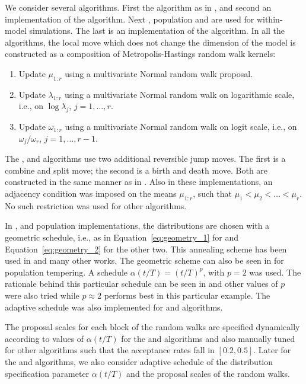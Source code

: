 We consider several algorithms. First the \rjmcmc algorithm as in
\cite{Richardson:1997ea}, and second an implementation of the \smc[1]
algorithm. Next \ais, population \mcmc and \smc[2] are used for within-model
simulations. The last is an implementation of the \smc[3] algorithm. In all
the algorithms, the local move which does not change the dimension of the
model is constructed as a composition of Metropolis-Hastings random walk
kernels:
\begin{enumerate}
  \item Update $\mu_{1:r}$ using a multivariate Normal random walk proposal.
  \item Update $\lambda_{1:r}$ using a multivariate Normal random walk on
    logarithmic scale, i.e., on $\log\lambda_{j}$, $j = 1, \dots, r$.
  \item Update $\omega_{1:r}$ using a multivariate Normal random walk on logit
    scale, i.e., on $\omega_{j}/\omega_r$, $j = 1,\dots,r-1$.
\end{enumerate}
The \rjmcmc, \smc[1] and \smc[3] algorithms use two additional
reversible jump moves. The first is a combine and split move; the second is a
birth and death move. Both are constructed in the same manner as in
\cite{Richardson:1997ea}. Also in these implementations, an adjacency
condition was imposed on the means $\mu_{1:r}$, such that $\mu_1 < \mu_2 <
\dots < \mu_r$. No such restriction was used for other algorithms.

In \smc[1], \smc[2] and population \mcmc implementations, the distributions
are chosen with a geometric schedule, i.e., as in
Equation~\eqref{eq:geometry_1} for \smc[1] and Equation~\eqref{eq:geometry_2}
for the other two. This annealing scheme has been used in
\cite{DelMoral:2006hc,Jasra:2007in} and many other works. The geometric scheme
can also be seen in \cite{Calderhead:2009bd} for population \mcmc tempering. A
schedule $\alpha(t/T) = (t/T)^p$, with $p = 2$ was used. The rationale behind
this particular schedule can be seen in \cite{Calderhead:2009bd} and other
values of $p$ were also tried while $p\approx2$ performs best in this
particular example. The adaptive schedule was also implemented for \smc[2] and
\ais algorithms.

The proposal scales for each block of the random walks are specified
dynamically according to values of $\alpha(t/T)$ for the \smc[2] and \ais
algorithms and also manually tuned for other algorithms such that the
acceptance rates fall in $[0.2, 0.5]$. Later for the \smc[2] and \ais
algorithms, we also consider adaptive schedule of the distribution
specification parameter $\alpha(t/T)$ and the proposal scales of the random
walks.

